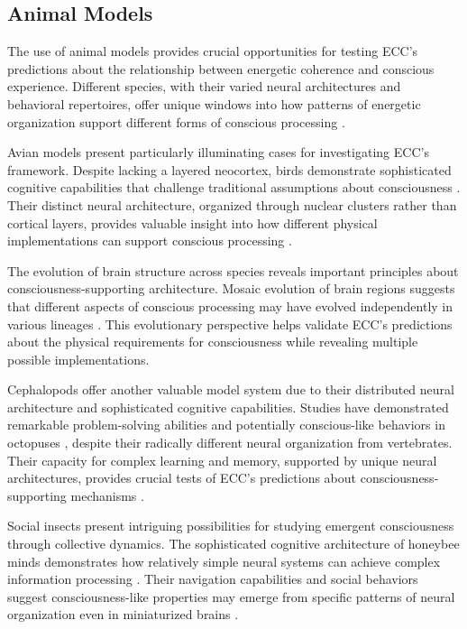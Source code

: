 \begin{refsection}
\section{Animal Models}

The use of animal models provides crucial opportunities for testing ECC's predictions about the relationship between energetic coherence and conscious experience. Different species, with their varied neural architectures and behavioral repertoires, offer unique windows into how patterns of energetic organization support different forms of conscious processing \cite{Boly2013}.

Avian models present particularly illuminating cases for investigating ECC's framework. Despite lacking a layered neocortex, birds demonstrate sophisticated cognitive capabilities that challenge traditional assumptions about consciousness \cite{Gunturkun2016}. Their distinct neural architecture, organized through nuclear clusters rather than cortical layers, provides valuable insight into how different physical implementations can support conscious processing \cite{Clayton2015}.

The evolution of brain structure across species reveals important principles about consciousness-supporting architecture. Mosaic evolution of brain regions suggests that different aspects of conscious processing may have evolved independently in various lineages \cite{Barton2000}. This evolutionary perspective helps validate ECC's predictions about the physical requirements for consciousness while revealing multiple possible implementations.

Cephalopods offer another valuable model system due to their distributed neural architecture and sophisticated cognitive capabilities. Studies have demonstrated remarkable problem-solving abilities and potentially conscious-like behaviors in octopuses \cite{Mather2008}, despite their radically different neural organization from vertebrates. Their capacity for complex learning and memory, supported by unique neural architectures, provides crucial tests of ECC's predictions about consciousness-supporting mechanisms \cite{Teyke1989}.

Social insects present intriguing possibilities for studying emergent consciousness through collective dynamics. The sophisticated cognitive architecture of honeybee minds demonstrates how relatively simple neural systems can achieve complex information processing \cite{Menzel2001}. Their navigation capabilities and social behaviors suggest consciousness-like properties may emerge from specific patterns of neural organization even in miniaturized brains \cite{Webb2016}.


\end{refsection}

